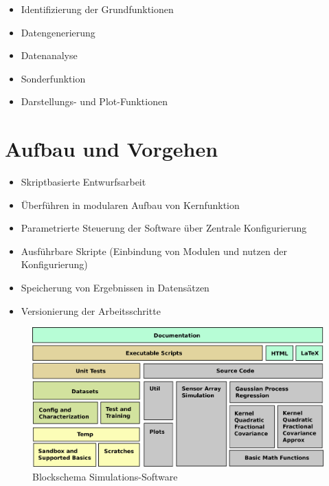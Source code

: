 \begin{itemize}
	\item Identifizierung der Grundfunktionen
	\item Datengenerierung
	\item Datenanalyse
	\item Sonderfunktion
	\item Darstellungs- und Plot-Funktionen
\end{itemize}

\clearpage

 
\section{Aufbau und Vorgehen}\label{sec:aufbau-und-vorgehen}
	\begin{itemize}
		\item Skriptbasierte Entwurfsarbeit
		\item Überführen in modularen Aufbau von Kernfunktion
		\item Parametrierte Steuerung der Software über Zentrale Konfigurierung
		\item Ausführbare Skripte (Einbindung von Modulen und nutzen der Konfigurierung)
		\item Speicherung von Ergebnissen in Datensätzen
		\item Versionierung der Arbeitsschritte
	\end{itemize}


\begin{figure}[tbph]
	\centering
	\includegraphics[width=\linewidth]{chapters/images/3-SW-E-OExp/Blockschema_Software}
	\caption[Blockschema Simulations-Software]{Blockschema Simulations-Software}
	\label{fig:blockschemasoftware}
\end{figure}



\clearpage

